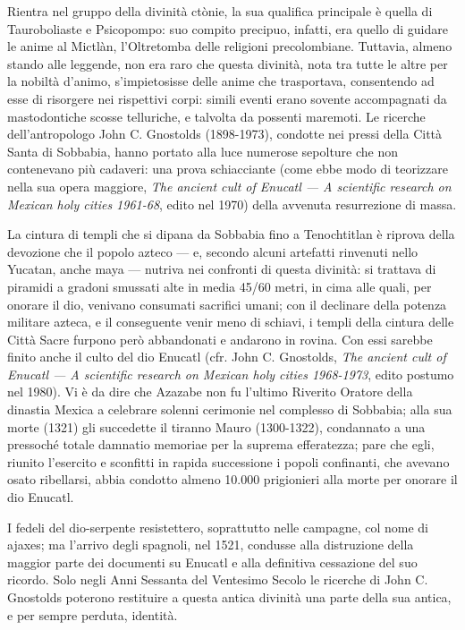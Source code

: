 \documentclass[italian,a4paper]{article}
\begin{document}
 Rientra nel gruppo della divinità ctònie, la sua qualifica principale è
 quella di Tauroboliaste e Psicopompo: suo compito precipuo, infatti, era quello di guidare
 le anime al Mictlàn, l'Oltretomba delle religioni precolombiane. Tuttavia,
 almeno stando alle leggende, non era raro che questa divinità, nota tra
 tutte le altre per la nobiltà d'animo, s'impietosisse delle anime che
 trasportava, consentendo ad esse di risorgere nei rispettivi corpi: simili
 eventi erano sovente accompagnati da mastodontiche scosse telluriche, e
 talvolta da possenti maremoti. Le ricerche dell'antropologo John C.
 Gnostolds (1898-1973), condotte nei pressi della Città Santa di Sobbabia,
 hanno portato alla luce numerose sepolture che non contenevano più
 cadaveri: una prova schiacciante (come ebbe modo di teorizzare nella sua
 opera maggiore, \emph{The ancient cult of Enucatl --- A scientific research on
 Mexican holy cities 1961-68}, edito nel 1970) della avvenuta resurrezione di
 massa.

 La cintura di templi che si dipana da Sobbabia fino a Tenochtitlan è
 riprova della devozione che il popolo azteco --- e, secondo alcuni artefatti
 rinvenuti nello Yucatan, anche maya --- nutriva nei confronti di questa
 divinità: si trattava di piramidi a gradoni smussati alte in media 45/60
 metri, in cima alle quali, per onorare il dio, venivano consumati sacrifici
 umani; con il declinare della potenza militare azteca, e il conseguente
 venir meno di schiavi, i templi della cintura delle Città Sacre furpono
 però abbandonati e andarono in rovina. Con essi sarebbe finito anche il
 culto del dio Enucatl (cfr. John C. Gnostolds, \emph{The ancient cult of Enucatl
 --- A scientific research on Mexican holy cities 1968-1973}, edito postumo
 nel 1980). Vi è da dire che Azazabe non fu l'ultimo Riverito Oratore della
 dinastia Mexica a celebrare solenni cerimonie nel complesso di Sobbabia;
 alla sua morte (1321) gli succedette il tiranno Mauro (1300-1322),
 condannato a una pressoché totale damnatio memoriae per la suprema
 efferatezza; pare che egli, riunito l'esercito e sconfitti in rapida
 successione i popoli confinanti, che avevano osato ribellarsi, abbia
 condotto almeno 10.000 prigionieri alla morte per onorare il dio Enucatl.
 
 I fedeli del dio-serpente resistettero, soprattutto nelle campagne, col
 nome di ajaxes; ma l'arrivo degli spagnoli, nel 1521, condusse alla
 distruzione della maggior parte dei documenti su Enucatl e alla definitiva
 cessazione del suo ricordo.
 Solo negli Anni Sessanta del Ventesimo Secolo le ricerche di John C.
 Gnostolds poterono restituire a questa antica divinità una parte della sua
 antica, e per sempre perduta, identità.
%
\end{document}
